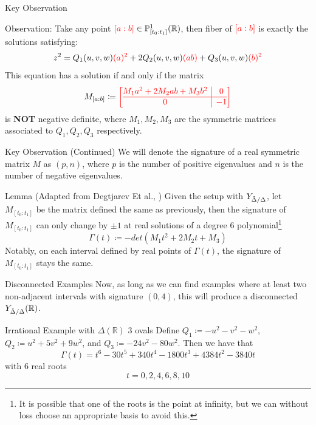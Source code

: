 \documentclass[hyperref, notheorems]{beamer}
\newcommand{\Rbb}{\mathbb{R}}
\newcommand{\Pbb}{\mathbb{P}}
\newcommand{\Ydd}{Y_{\Tilde{\Delta} /\Delta}}
\theoremstyle{definition}
\begin{document}
\begin{frame}{Key Observation}
\begin{block}{Observation:}
    Take any point ${\color{red} [a: b]} \in \Pbb^1_{[t_0: t_1]}(\Rbb)$, then fiber of ${\color{red} [a: b]}$ is exactly the solutions satisfying:
   \[z^2 = Q_1(u, v, w){\color{red}(a)^2} + 2Q_2(u, v, w){\color{red}(ab)} + Q_3(u, v, w){\color{red}(b)^2}\]
   This equation has a solution if and only if the matrix
   \[M_{[a: b]} \coloneqq {\color{red}
\left[\begin{array}{@{}c|c@{}}
  \begin{matrix}
    M_1a^2 + 2M_2ab + M_3b^2
  \end{matrix}
  & 0 \\
\hline
  0 &
  \begin{matrix}
  -1
  \end{matrix}
\end{array}\right]
   }\] is \textbf{NOT} negative definite, where $M_1, M_2, M_3$ are the symmetric matrices associated to $Q_1, Q_2, Q_3$ respectively.
\end{block}
\end{frame}

\begin{frame}{Key Observation (Continued)}
    We will denote the signature of a real symmetric matrix $M$ as $(p, n)$, where $p$ is the number of positive eigenvalues and $n$ is the number of negative eigenvalues.

    \begin{block}{Lemma (Adapted from Degtjarev Et al., \cite{degtjarev_itenberg_kharlamov_2000})}
    Given the setup with $\Ydd$, let $M_{[t_0: t_1]}$ be the matrix defined the same as previously, then the signature of $M_{[t_0: t_1]}$ can only change by $\pm 1$ at real solutions of a degree $6$ polynomial\footnote{It is possible that one of the roots is the point at infinity, but we can without loss choose an appropriate basis to avoid this.}
    \[\Gamma(t) \coloneqq -det(M_1t^2 + 2M_2t + M_3)\]
    Notably, on each interval defined by real points of $\Gamma(t)$, the signature of $M_{[t_0: t_1]}$ stays the same.
    \end{block}
\end{frame}

\begin{frame}{Disconnected Examples}
    Now, as long as we can find examples where at least two non-adjacent intervals with signature $(0, 4)$, this will produce a disconnected $\Ydd(\Rbb)$.
\begin{block}{Irrational Example with $\Delta(\Rbb)$ $3$ ovals}
Define $Q_1 \coloneqq  -u^2 - v^2 - w^2$, $Q_2 \coloneqq u^2 + 5v^2 + 9w^2$, and $Q_3 \coloneqq -24v^2 - 80w^2$. Then we have that
\[\Gamma(t) = t^6 - 30t^5 + 340t^4 - 1800t^3 + 4384t^2 - 3840t\] with $6$ real roots
\[t = 0, 2, 4, 6, 8, 10\]
\end{block}    
\end{frame}
\end{document}
